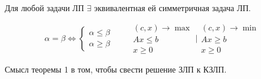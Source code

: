 \begin{theorem}
	Для любой задачи ЛП $\exists $ эквивалентная ей симметричная задача ЛП.
\end{theorem}

\begin{note}
	\[
		\alpha = \beta \iff \left\{\begin{array}{l}
			\alpha \leqslant \beta \\
			\alpha \geqslant \beta
		\end{array}\right. \qquad \begin{array}{l}
			(c,x)\rightarrow \max \\
			Ax \leqslant b        \\
			x \geqslant 0
		\end{array} \Bigg| \begin{array}{l}
			(c,x) \rightarrow \min \\
			Ax \geqslant b         \\
			x \geqslant 0
		\end{array}
	\]
\end{note}

\begin{remark}
	Смысл теоремы 1 в том, чтобы свести решение ЗЛП к КЗЛП.
\end{remark}

